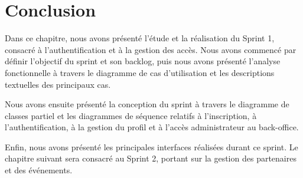\section{Conclusion}


Dans ce chapitre, nous avons présenté l’étude et la réalisation du Sprint 1, consacré à l’authentification et à la gestion des accès. Nous avons commencé par définir l’objectif du sprint et son backlog, puis nous avons présenté l’analyse fonctionnelle à travers le diagramme de cas d’utilisation et les descriptions textuelles des principaux cas.


Nous avons ensuite présenté la conception du sprint à travers le diagramme de classes partiel et les diagrammes de séquence relatifs à l’inscription, à l’authentification, à la gestion du profil et à l’accès administrateur au back-office.


Enfin, nous avons présenté les principales interfaces réalisées durant ce sprint. Le chapitre suivant sera consacré au Sprint 2, portant sur la gestion des partenaires et des événements.


